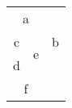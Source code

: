 \documentclass{article}
\begin{document}
\subsection{}
\begin{tabular}{|c|c|c|}
\hline
    \multicolumn{2}{|c|}{\multirow{2}{*}{a}}     & \multirow{6}{*}{b}   \\
    \multicolumn{2}{|c|}{}                       &                      \\ \cline{1-2}
    {c} & \multirow{2}{*}{e}                    &                       \\ \cline{1-1}
    {d}     &           &                           \\ \cline{1-2}
\multicolumn{2}{|c|}{\multirow{4}{*}{f}}     &                                         \\
\multicolumn{2}{|c|}{}                       &                                         \\ \cline{3-3} 
\multicolumn{2}{|c|}{}                       & {\multirow{2}{*}{g}} \\
\multicolumn{2}{|c|}{}                       &                  \\ \hline
\end{tabular}
\end{document}
